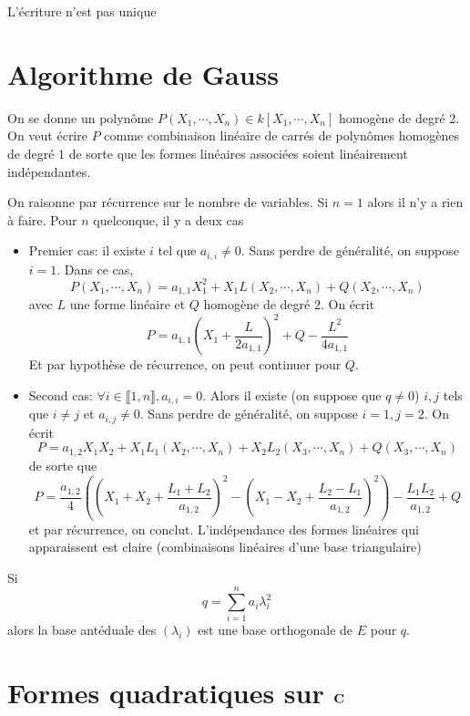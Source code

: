 \begin{rem}
L'écriture n'est pas unique
\end{rem}

\section{Algorithme de Gauss}

On se donne un polynôme $P(X_1, \cdots , X_n) \in  k[X_1, \cdots , X_n]$ homogène de degré 2. On veut écrire $P$ comme combinaison linéaire de carrés de polynômes homogènes de degré  $1$ de sorte que les formes linéaires associées soient linéairement indépendantes.

On raisonne par récurrence sur le nombre de variables. Si $n=1$ alors il n'y a rien à faire. Pour $n$ quelconque, il y a deux cas
 \begin{itemize}
    \item Premier cas: il existe $i$ tel que  $a_{i,i}\neq 0$. Sans perdre de généralité, on suppose $i=1$. Dans ce cas,  \[
            P(X_1, \cdots , X_n)=a_{1,1} X_1 ^2 + X_1 L(X_2, \cdots , X_n) + Q(X_2, \cdots , X_n)
    \] 
    avec $L$ une forme linéaire et  $Q$ homogène de degré  $2$. On écrit  \[
        P = a_{1, 1} \left( X_1 + \frac{L}{2a_{1,1}} \right)^2 +Q - \frac{L^2 }{4a_{1,1}}
    \]
    Et par hypothèse de récurrence, on peut continuer pour $Q$.
\item Second cas: $\forall  i \in \llbracket 1, n \rrbracket , a_{i, i}=0$. Alors il existe (on suppose que $q\neq 0$) $i,j$ tels que  $i\neq j$ et  $a_{i,j}\neq 0$. Sans perdre de généralité, on suppose $i=1, j=2$. On écrit \[
        P=a_{1,2}X_1X_2+X_1 L_1(X_2, \cdots , X_n)+X_2 L_2(X_3, \cdots , X_n)+Q(X_3, \cdots , X_n)
\] 
de sorte que \[
    P= \frac{a_{1,2}}{4} \left( \left( X_1+X_2+\frac{L_1+L_2}{a_{1,2}} \right)^2 - \left( X_1-X_2 + \frac{L_2-L_1}{a_{1,2}} \right) ^2 \right)  - \frac{L_1L_2}{a_{1, 2}}+Q
\] 
et par récurrence, on conclut. L'indépendance des formes linéaires qui apparaissent est claire (combinaisons linéaires d'une base triangulaire)
\end{itemize}

\begin{rem}
Si \[
q=\sum_{i=1}^n a_i \lambda_i^2 
\] 
alors la base antéduale des $(\lambda_i)$ est une base orthogonale de $E$ pour  $q$.
\end{rem}

\section{Formes quadratiques sur \texorpdfstring{$ \mathbf C$}{C}}

